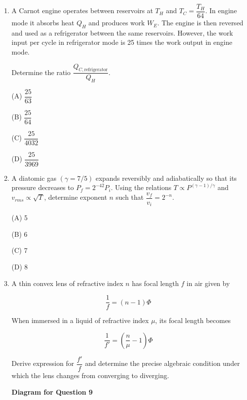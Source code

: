 \documentclass[12pt]{article}
\begin{document}
\begin{enumerate}

(A) $\dfrac{A}{14}\sqrt{19601}$  

(B) $\dfrac{A}{14}\sqrt{18001}$ 

(C) $\dfrac{A}{14}\sqrt{16201}$  

(D) $\dfrac{A}{14}\sqrt{20001}$  

\item A Carnot engine operates between reservoirs at $T_H$ and $T_C=\dfrac{T_H}{64}$. In engine mode it absorbs heat $Q_H$ and produces work $W_E$. The engine is then reversed and used as a refrigerator between the same reservoirs. However, the work input per cycle in refrigerator mode is 25 times the work output in engine mode.

Determine the ratio $\dfrac{Q_{C,\text{refrigerator}}}{Q_H}$.

(A) $\dfrac{25}{63}$ 

(B) $\dfrac{25}{64}$  

(C) $\dfrac{25}{4032}$  

(D) $\dfrac{25}{3969}$  

\item A diatomic gas $(\gamma=7/5)$ expands reversibly and adiabatically so that its pressure decreases to $P_f=2^{-42}P_i$. Using the relations $T\propto P^{(\gamma-1)/\gamma}$ and $v_{rms}\propto\sqrt{T}$, determine exponent $n$ such that $\dfrac{v_f}{v_i}=2^{-n}$.

(A) 5  

(B) 6  

(C) 7  

(D) 8  

\item A thin convex lens of refractive index $n$ has focal length $f$ in air given by  

\[
\frac{1}{f}=(n-1)\Phi
\]

When immersed in a liquid of refractive index $\mu$, its focal length becomes  

\[
\frac{1}{f'}=\left(\frac{n}{\mu}-1\right)\Phi
\]

Derive expression for $\dfrac{f'}{f}$ and determine the precise algebraic condition under which the lens changes from converging to diverging.


\begin{center}
\textbf{Diagram for Question 9}
\end{center}


\end{enumerate}
\end{document}
